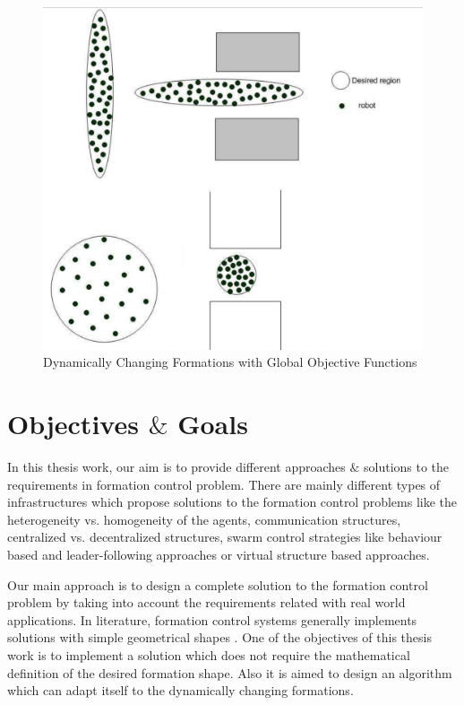 \begin{figure}[H]
\caption{Dynamically Changing Formations with Global Objective Functions \cite{8}}
\centering
\includegraphics[scale = 0.32]{houslotine}
\end{figure}


\section{Objectives $\&$ Goals} \label{Objectives}
In this thesis work, our aim is to provide different approaches $\&$ solutions to the requirements in formation control problem.  There are mainly different types of  infrastructures which propose solutions to the formation control problems like the heterogeneity vs. homogeneity of the agents, communication structures, centralized vs. decentralized structures, swarm control strategies like behaviour based and leader-following approaches or virtual structure based approaches. 

Our main approach is to design a complete solution to the formation control problem by taking into account the requirements related with real world applications. In literature, formation control systems generally implements solutions with simple geometrical shapes \cite{8}. One of the objectives of this thesis work is to implement a solution which does not require the mathematical definition of the desired formation shape. Also it is aimed to design an algorithm which can adapt itself to the dynamically changing formations.

